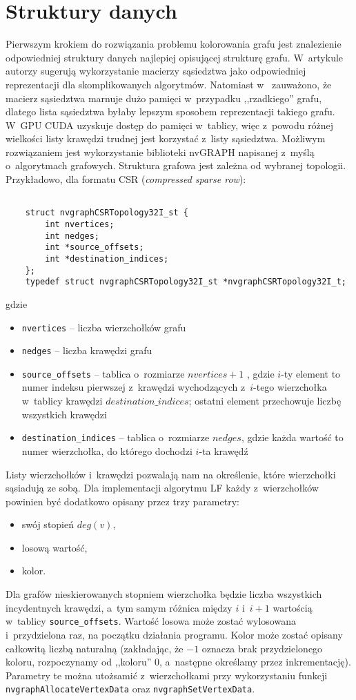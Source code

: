 \documentclass{article}
\begin{document}
	\section{Struktury danych}
	Pierwszym krokiem do rozwiązania problemu kolorowania grafu jest znalezienie odpowiedniej struktury danych najlepiej opisującej strukturę grafu. W~artykule \cite{Shen2017} autorzy sugerują wykorzystanie macierzy sąsiedztwa jako odpowiedniej reprezentacji dla skomplikowanych algorytmów. Natomiast w~\cite{SINGH20155} zauważono, że macierz sąsiedztwa marnuje dużo pamięci w~przypadku ,,rzadkiego'' grafu, dlatego lista sąsiedztwa byłaby lepszym sposobem reprezentacji takiego grafu. W~GPU CUDA uzyskuje dostęp do pamięci w~tablicy, więc z~powodu różnej wielkości listy krawędzi trudnej jest korzystać z~listy sąsiedztwa. Możliwym rozwiązaniem jest wykorzystanie biblioteki nvGRAPH \cite{nvgraph} napisanej z~myślą o~algorytmach grafowych. Struktura grafowa jest zależna od wybranej topologii. Przykładowo, dla formatu CSR (\textit{compressed sparse row}):
	\begin{lstlisting}
	
	struct nvgraphCSRTopology32I_st {
		int nvertices;
		int nedges;
		int *source_offsets;
		int *destination_indices;
	};
	typedef struct nvgraphCSRTopology32I_st *nvgraphCSRTopology32I_t;
	\end{lstlisting}
	gdzie
	\begin{itemize}
		\itemsep0em
		\item \texttt{nvertices} -- liczba wierzchołków grafu
		\item \texttt{nedges} -- liczba krawędzi grafu
		\item \texttt{source\_offsets} -- tablica o~rozmiarze $nvertices+1$ , gdzie $i$-ty element to numer indeksu pierwszej z~krawędzi wychodzących z~$i$-tego wierzchołka w~tablicy krawędzi $destination\_indices$; ostatni element przechowuje liczbę wszystkich krawędzi
		\item \texttt{destination\_indices} -- tablica o~rozmiarze $nedges$, gdzie każda wartość to numer wierzchołka, do którego dochodzi $i$-ta krawędź
	\end{itemize}
	Listy wierzchołków i~krawędzi pozwalają nam na określenie, które wierzchołki sąsiadują ze sobą. Dla implementacji algorytmu LF każdy z~wierzchołków powinien być dodatkowo opisany przez trzy parametry:
	\begin{itemize}
		\itemsep0em
		\item swój stopień $deg(v)$,
		\item losową wartość, 
		\item kolor. 
	\end{itemize}
	Dla grafów nieskierowanych stopniem wierzchołka będzie liczba wszystkich incydentnych krawędzi, a~tym samym różnica między $i$ i~$i+1$ wartością w~tablicy \texttt{source\_offsets}. Wartość losowa może zostać wylosowana i~przydzielona raz, na początku działania programu. Kolor może zostać opisany całkowitą liczbą naturalną (zakładając, że $-1$ oznacza brak przydzielonego koloru, rozpoczynamy od ,,koloru'' 0, a~następne określamy przez inkrementację). Parametry te można utożsamić z~wierzchołkami przy wykorzystaniu funkcji \texttt{nvgraphAllocateVertexData} oraz \texttt{nvgraphSetVertexData}.
	
\end{document}
